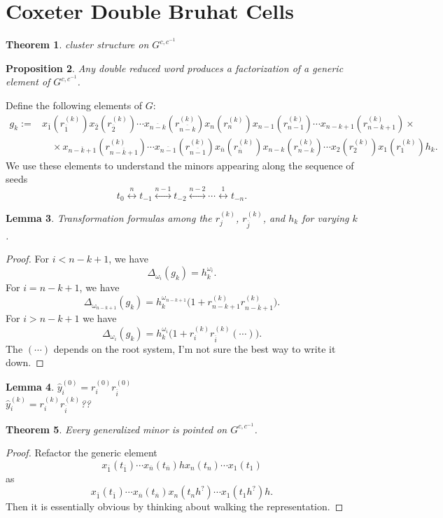 \documentclass{amsart}
\newtheorem{theorem}{Theorem}
\newtheorem{lemma}[theorem]{Lemma}
\newtheorem{proposition}[theorem]{Proposition}
\newcommand{\ol}[1]{\overline{#1}}
\begin{document}
  \section{Coxeter Double Bruhat Cells}
    \begin{theorem}
      cluster structure on $G^{c,c^{-1}}$
    \end{theorem}

    \begin{proposition}
      \cite[Prop. 2.2]{rsw19}
      Any double reduced word produces a factorization of a generic element of $G^{c,c^{-1}}$.
    \end{proposition}
    
    Define the following elements of $G$:
    \begin{align}
      \label{eq:generic factorizations}
      g_k:=&x_{\ol{1}}(r_{\ol{1}}^{(k)}) x_{\ol{2}}(r_{\ol{2}}^{(k)}) \cdots x_{\ol{n-k}}(r_{\ol{n-k}}^{(k)}) x_n(r_n^{(k)}) x_{n-1}(r_{n-1}^{(k)}) \cdots x_{n-k+1}(r_{n-k+1}^{(k)})\times\\
      \nonumber & \quad \times x_{\ol{n-k+1}}(r_{\ol{n-k+1}}^{(k)}) \cdots x_{\ol{n-1}}(r_{\ol{n-1}}^{(k)}) x_{\ol{n}}(r_{\ol{n}}^{(k)}) x_{n-k}(r_{n-k}^{(k)}) \cdots x_2(r_2^{(k)}) x_1(r_1^{(k)}) h_k.
    \end{align}
    We use these elements to understand the minors appearing along the sequence of seeds
    \[t_0 \stackrel{n}{\longleftrightarrow} t_{-1} \stackrel{n-1}{\longleftrightarrow} t_{-2} \stackrel{n-2}{\longleftrightarrow} \cdots \stackrel{1}{\longleftrightarrow} t_{-n}.\]
    \begin{lemma}
      Transformation formulas among the $r_j^{(k)}$, $r_{\ol{j}}^{(k)}$, and $h_k$ for varying $k$.
    \end{lemma}
    \begin{proof}
      For $i<n-k+1$, we have
      \[\Delta_{\omega_i}(g_k)=h_k^{\omega_i}.\]
      For $i=n-k+1$, we have
      \[\Delta_{\omega_{n-k+1}}(g_k)=h_k^{\omega_{n-k+1}}\big(1+r_{n-k+1}^{(k)}r_{\ol{n-k+1}}^{(k)}\big).\]
      For $i>n-k+1$ we have
      \[\Delta_{\omega_i}(g_k)=h_k^{\omega_i}\big(1+r_i^{(k)}r_{\ol{i}}^{(k)}(\cdots)\big).\]
      The $(\cdots)$ depends on the root system, I'm not sure the best way to write it down.
    \end{proof}

    \begin{lemma}
      $\hat y_i^{(0)}=r_i^{(0)} r_{\ol{i}}^{(0)}$\\
      $\hat y_i^{(k)}=r_i^{(k)} r_{\ol{i}}^{(k)}$??\\
    \end{lemma}
    \begin{theorem}
      Every generalized minor is pointed on $G^{c,c^{-1}}$.
    \end{theorem}
    \begin{proof}
      Refactor the generic element 
      \[x_{\ol{1}}(t_{\ol{1}})\cdots x_{\ol{n}}(t_{\ol{n}})h x_n(t_n)\cdots x_1(t_1)\]
      as
      \[x_{\ol{1}}(t_{\ol{1}})\cdots x_{\ol{n}}(t_{\ol{n}}) x_n(t_nh^{?})\cdots x_1(t_1h^{?}) h.\]
      Then it is essentially obvious by thinking about walking the representation.
    \end{proof}
\end{document}
